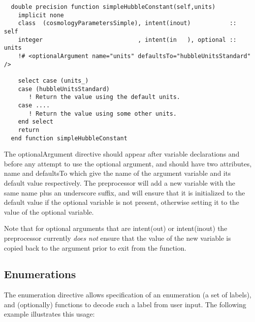 \begin{lstlisting}
  double precision function simpleHubbleConstant(self,units)
    implicit none
    class  (cosmologyParametersSimple), intent(inout)           :: self
    integer                           , intent(in   ), optional :: units
    !# <optionalArgument name="units" defaultsTo="hubbleUnitsStandard" />

    select case (units_)
    case (hubbleUnitsStandard)
       ! Return the value using the default units.
    case ....
       ! Return the value using some other units.
    end select
    return
  end function simpleHubbleConstant
\end{lstlisting}
The {\normalfont \ttfamily optionalArgument} directive should appear after variable declarations and before any attempt to use the optional argument, and should have two attributes, {\normalfont \ttfamily name} and {\normalfont \ttfamily defaultsTo} which give the name of the argument variable and its default value respectively. The preprocessor will add a new variable with the same name plus an underscore suffix, and will ensure that it is initialized to the default value if the optional variable is not present, otherwise setting it to the value of the optional variable.

Note that for optional arguments that are {\normalfont \ttfamily intent(out)} or {\normalfont \ttfamily intent(inout)} the preprocessor currently \emph{does not} ensure that the value of the new variable is copied back to the argument prior to exit from the function.

\subsection{Enumerations}

The {\normalfont \ttfamily enumeration} directive allows specification of an enumeration (a set of labels), and (optionally) functions to decode such a label from user input. The following example illustrates this usage:

